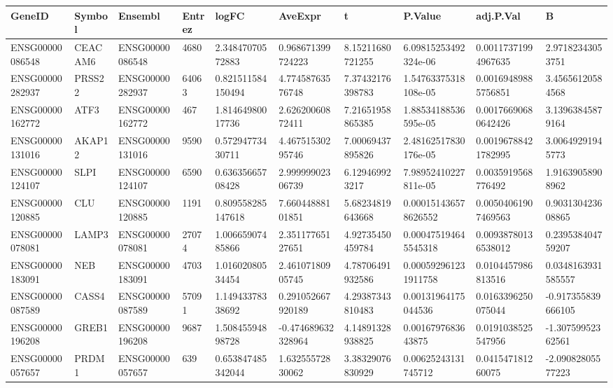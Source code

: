 \begingroup
\tiny
\setlength{\tabcolsep}{2pt}
\renewcommand{\arraystretch}{1.18}
\begin{tabular}{@{}llllllllll@{}}
\toprule
GeneID & Symbol & Ensembl & Entrez & logFC & AveExpr & t & P.Value & adj.P.Val & B \\
\midrule
ENSG00000086548 & CEACAM6 & ENSG00000086548 & 4680 & 2.34847070572883 & 0.968671399724223 & 8.15211680721255 & 6.09815253492324e-06 & 0.00117371994967635 & 2.97182343053751 \\
ENSG00000282937 & PRSS22 & ENSG00000282937 & 64063 & 0.821511584150494 & 4.77458763576748 & 7.37432176398783 & 1.54763375318108e-05 & 0.00169489885756851 & 3.45656120584568 \\
ENSG00000162772 & ATF3 & ENSG00000162772 & 467 & 1.81464980017736 & 2.62620060872411 & 7.21651958865385 & 1.88534188536595e-05 & 0.00176690680642426 & 3.13963845879164 \\
ENSG00000131016 & AKAP12 & ENSG00000131016 & 9590 & 0.57294773430711 & 4.46751530295746 & 7.00069437895826 & 2.48162517830176e-05 & 0.00196788421782995 & 3.00649291945773 \\
ENSG00000124107 & SLPI & ENSG00000124107 & 6590 & 0.63635665708428 & 2.99999902306739 & 6.129469923217 & 7.98952410227811e-05 & 0.0035919568776492 & 1.91639058908962 \\
ENSG00000120885 & CLU & ENSG00000120885 & 1191 & 0.809558285147618 & 7.66044888101851 & 5.68234819643668 & 0.000151436578626552 & 0.00504061907469563 & 0.903130423608865 \\
ENSG00000078081 & LAMP3 & ENSG00000078081 & 27074 & 1.00665907485866 & 2.35117765127651 & 4.92735450459784 & 0.000475194645545318 & 0.00938780136538012 & 0.239538404759207 \\
ENSG00000183091 & NEB & ENSG00000183091 & 4703 & 1.01602080534454 & 2.46107180905745 & 4.78706491932586 & 0.000592961231911758 & 0.0104457986813516 & 0.0348163931585557 \\
ENSG00000087589 & CASS4 & ENSG00000087589 & 57091 & 1.14943378338692 & 0.291052667920189 & 4.29387343810483 & 0.00131964175044536 & 0.0163396250075044 & -0.917355839666105 \\
ENSG00000196208 & GREB1 & ENSG00000196208 & 9687 & 1.50845594898728 & -0.474689632328964 & 4.14891328938825 & 0.0016797683643875 & 0.0191038525547956 & -1.30759952362561 \\
ENSG00000057657 & PRDM1 & ENSG00000057657 & 639 & 0.653847485342044 & 1.63255572830062 & 3.38329076830929 & 0.00625243131745712 & 0.041547181260075 & -2.09082805577223 \\

\end{tabular}
